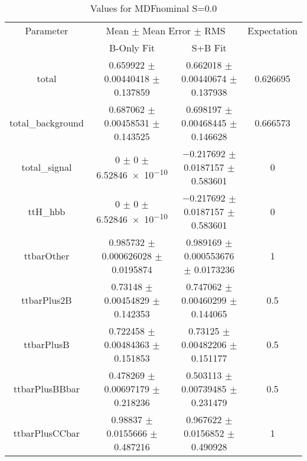 \begin{table}
\centering
\caption{Values for MDFnominal S=0.0}
\begin{tabular}{cccc}
\toprule
Parameter & \multicolumn{2}{c}{Mean $\pm$ Mean Error $\pm$ RMS} & Expectation\\
 & B-Only Fit & S+B Fit & \\
\midrule
total & \num{0.659922} $\pm$ \num{0.00440418} $\pm$ \num{0.137859} & \num{0.662018} $\pm$ \num{0.00440674} $\pm$ \num{0.137938} & \num{0.626695}\\
total\_background & \num{0.687062} $\pm$ \num{0.00458531} $\pm$ \num{0.143525} & \num{0.698197} $\pm$ \num{0.00468445} $\pm$ \num{0.146628} & \num{0.666573}\\
total\_signal & \num{0} $\pm$ \num{0} $\pm$ \num{6.52846e-10} & \num{-0.217692} $\pm$ \num{0.0187157} $\pm$ \num{0.583601} & \num{0}\\
ttH\_hbb & \num{0} $\pm$ \num{0} $\pm$ \num{6.52846e-10} & \num{-0.217692} $\pm$ \num{0.0187157} $\pm$ \num{0.583601} & \num{0}\\
ttbarOther & \num{0.985732} $\pm$ \num{0.000626028} $\pm$ \num{0.0195874} & \num{0.989169} $\pm$ \num{0.000553676} $\pm$ \num{0.0173236} & \num{1}\\
ttbarPlus2B & \num{0.73148} $\pm$ \num{0.00454829} $\pm$ \num{0.142353} & \num{0.747062} $\pm$ \num{0.00460299} $\pm$ \num{0.144065} & \num{0.5}\\
ttbarPlusB & \num{0.722458} $\pm$ \num{0.00484363} $\pm$ \num{0.151853} & \num{0.73125} $\pm$ \num{0.00482206} $\pm$ \num{0.151177} & \num{0.5}\\
ttbarPlusBBbar & \num{0.478269} $\pm$ \num{0.00697179} $\pm$ \num{0.218236} & \num{0.503113} $\pm$ \num{0.00739485} $\pm$ \num{0.231479} & \num{0.5}\\
ttbarPlusCCbar & \num{0.98837} $\pm$ \num{0.0155666} $\pm$ \num{0.487216} & \num{0.967622} $\pm$ \num{0.0156852} $\pm$ \num{0.490928} & \num{1}\\
\bottomrule
\end{tabular}
\end{table}